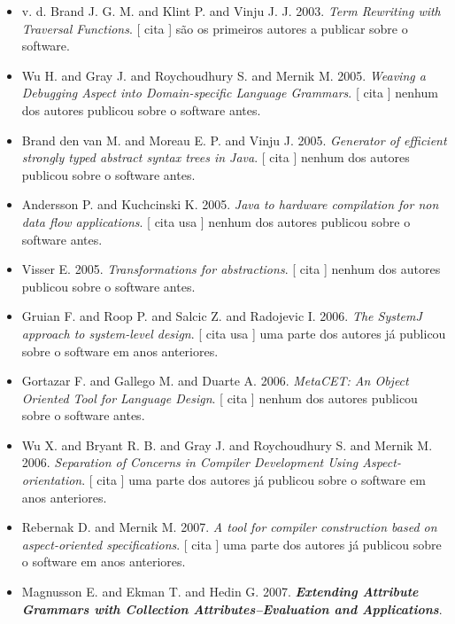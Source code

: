 \begin{itemize}
\item v. d. Brand J. G. M. and Klint P. and Vinju J. J.
      2003.
        \textit{ Term Rewriting with Traversal Functions}.
      [
          cita
      ]
são os primeiros autores a publicar sobre o software.
\item Wu H. and Gray J. and Roychoudhury S. and Mernik M.
      2005.
        \textit{ Weaving a Debugging Aspect into Domain-specific Language Grammars}.
      [
          cita
      ]
nenhum dos autores publicou sobre o software antes.
\item Brand den van M. and Moreau E. P. and Vinju J.
      2005.
        \textit{ Generator of efficient strongly typed abstract syntax trees in Java}.
      [
          cita
      ]
nenhum dos autores publicou sobre o software antes.
\item Andersson P. and Kuchcinski K.
      2005.
        \textit{ Java to hardware compilation for non data flow applications}.
      [
          cita
          usa
      ]
nenhum dos autores publicou sobre o software antes.
\item Visser E.
      2005.
        \textit{ Transformations for abstractions}.
      [
          cita
      ]
nenhum dos autores publicou sobre o software antes.
\item Gruian F. and Roop P. and Salcic Z. and Radojevic I.
      2006.
        \textit{ The SystemJ approach to system-level design}.
      [
          cita
          usa
      ]
uma parte dos autores já publicou sobre o software em anos anteriores.
\item Gortazar F. and Gallego M. and Duarte A.
      2006.
        \textit{ MetaCET: An Object Oriented Tool for Language Design}.
      [
          cita
      ]
nenhum dos autores publicou sobre o software antes.
\item Wu X. and Bryant R. B. and Gray J. and Roychoudhury S. and Mernik M.
      2006.
        \textit{ Separation of Concerns in Compiler Development Using Aspect-orientation}.
      [
          cita
      ]
uma parte dos autores já publicou sobre o software em anos anteriores.
\item Rebernak D. and Mernik M.
      2007.
        \textit{ A tool for compiler construction based on aspect-oriented specifications}.
      [
          cita
      ]
uma parte dos autores já publicou sobre o software em anos anteriores.
\item Magnusson E. and Ekman T. and Hedin G.
      2007.
        \textbf{\textit{ Extending Attribute Grammars with Collection Attributes--Evaluation and Applications}}.

\end{itemize}
